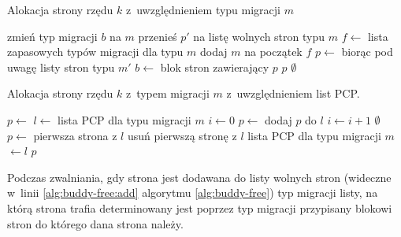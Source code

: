 \begin{algorithm}[p]
\caption[Alokacja z~uwzględnieniem typu migracji.]{Alokacja strony
  rzędu $k$ z~uwzględnieniem typu migracji $m$}
\label{alg:buddy-fallback}
\begin{algorithmic}[1]
\State zmień typ migracji $b$ na $m$
    \State przenieś $p'$ na listę wolnych stron typu $m$
\EndFor
\EndFunction
\Statex
{}
    \State $f \gets$ lista zapasowych typów migracji dla typu $m$
    \State dodaj $m$ na początek $f$
        \State $p \gets$  biorąc pod uwagę listy stron typu $m'$
                \State $b \gets$ blok stron zawierający $p$
                \State {}
            \EndIf
            \State \Return $p$
        \EndIf
    \EndFor
    \State \Return $\emptyset$
\EndFunction
\end{algorithmic}
\end{algorithm}

\begin{algorithm}[p]
\caption[Alokacja z~uwzględnieniem list PCP.]{Alokacja strony rzędu
  $k$ z~typem migracji $m$ z~uwzględnieniem list PCP.}
\label{alg:buddy-pcp}
\begin{algorithmic}[1]
        \State $p \gets$ 
    \Else
        \State $l \gets$ lista PCP dla typu migracji $m$
            \State $i \gets 0$
            \Repeat
                \State $p \gets$ 
                    \State dodaj $p$ do $l$
                    \State $i \gets i + 1$
                \EndIf
             
        \EndIf
            \State \Return $\emptyset$
        \Else
            \State $p \gets$ pierwsza strona z $l$
            \State usuń pierwszą stronę z $l$
            \State lista PCP dla typu migracji $m$ $\gets l$
        \EndIf
    \EndIf
    \State \Return $p$
\EndFunction
\end{algorithmic}
\end{algorithm}

Podczas zwalniania, gdy strona jest dodawana do listy wolnych stron
(wideczne w~linii \ref{alg:buddy-free:add} algorytmu
\ref{alg:buddy-free}) typ migracji listy, na którą strona trafia
determinowany jest poprzez typ migracji przypisany blokowi stron do
którego dana strona należy.

